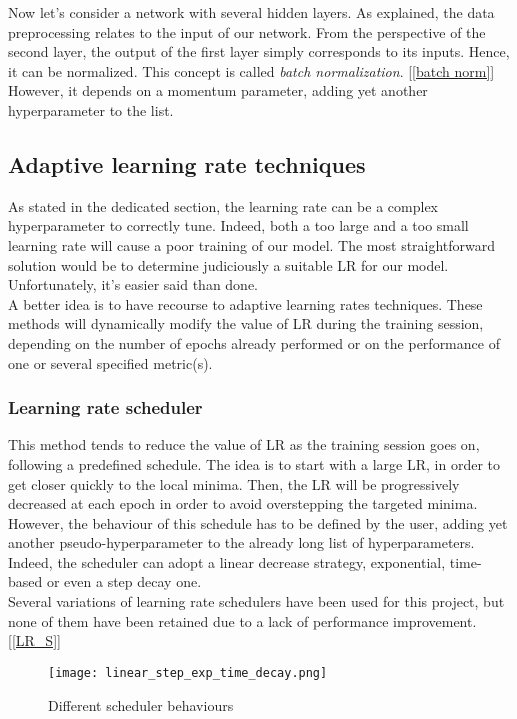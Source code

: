 \documentclass [12pt] {article}
\numberwithin{equation}{section} %
\numberwithin{figure}{section}   %
\begin{document}
Now let's consider a network with several hidden layers. As explained, the data preprocessing relates to the input of our network. From the perspective of the second layer, the output of the first layer simply corresponds to its inputs. Hence, it can be normalized. This concept is called \textit{batch normalization}. [\ref{batch norm}] However, it depends on a momentum parameter, adding yet another hyperparameter to the list.

\subsection{Adaptive learning rate techniques}

As stated in the dedicated section, the learning rate can be a complex hyperparameter to correctly tune. Indeed, both a too large and a too small learning rate will cause a poor training of our model. The most straightforward solution would be to determine judiciously a suitable LR for our model. Unfortunately, it's easier said than done.\\
A better idea is to have recourse to adaptive learning rates techniques. These methods will dynamically modify the value of LR during the training session, depending on the number of epochs already performed or on the performance of one or several specified metric(s).

\subsubsection{Learning rate scheduler}

This method tends to reduce the value of LR as the training session goes on, following a predefined schedule. The idea is to start with a large LR, in order to get closer quickly to the local minima. Then, the LR will be progressively decreased at each epoch in order to avoid overstepping the targeted minima.\\ 
However, the behaviour of this schedule has to be defined by the user, adding yet another pseudo-hyperparameter to the already long list of hyperparameters. Indeed, the scheduler can adopt a linear decrease strategy, exponential, time-based or even a step decay one.\\
Several variations of learning rate schedulers have been used for this project, but none of them have been retained due to a lack of performance improvement. [\ref{LR_S}]

\begin{figure}[H]
    \centering
    \texttt{[image: linear\_step\_exp\_time\_decay.png]}
    \caption{Different scheduler behaviours}
    \label{lrs}
\end{figure}
\end{document}
